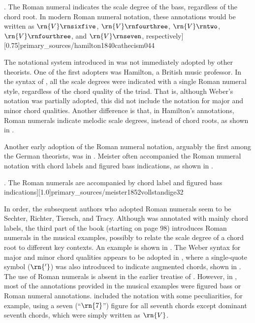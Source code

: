 

\phdfigure[Use of Roman numerals in \textcite[p.
44]{hamilton1840catechism}. The Roman numeral indicates the
scale degree of the bass, regardless of the chord root. In
modern Roman numeral notation, these annotations would be
written as $\rn{V}\rnsixfive$, $\rn{V}\rnfourthree$,
$\rn{V}\rntwo$, $\rn{V}\rnfourthree$, and $\rn{V}\rnseven$,
respectively][0.75]{primary_sources/hamilton1840cathecism044}

The notational system introduced in
\textcite{weber1818versuch} was not immediately adopted by
other theorists. One of the first adopters was Hamilton, a
British music professor. In the syntax of
\textcite{hamilton1840catechism}, all the scale degrees were
indicated with a single Roman numeral style, regardless of
the chord quality of the triad. That is, although Weber's
notation was partially adopted, this did not include the
notation for major and minor chord qualities. Another
difference is that, in Hamilton's annotations, Roman
numerals indicate melodic scale degrees, instead of chord
roots, as shown in
.

Another early adoption of the Roman numeral notation,
arguably the first among the German theorists, was in
\textcite{meister1852vollstandige}. Meister often
accompanied the Roman numeral notation with chord labels and
figured bass indications, as shown in
.

\phdfigure[Use of Roman numerals in \textcite[p.
32]{meister1852vollstandige}. The Roman numerals are
accompanied by chord label and figured bass
indications][1.0]{primary_sources/meister1852vollstandige32}

In order, the subsequent authors who adopted Roman numerals
seem to be Sechter, Richter, Tiersch, and Tracy. Although
\textcite{sechter1853grundsatze} was annotated with mainly
chord labels, the third part of the book (starting on page
98) introduces Roman numerals in the musical examples,
possibly to relate the scale degree of a chord root to
different key contexts. An example is shown in
. The Weber
syntax for major and minor chord qualities appears to be
adopted in \textcite{richter1860lehrbuch}, where a
single-quote symbol ($\rn{'}$) was also introduced to
indicate augmented chords, shown in
. The use of
Roman numerals is absent in the earlier treatise of
\textcite{tiersch1868system}. However,  in
\textcite{tiersch1874elementarbuch}, most of the annotations
provided in the musical examples were figured bass or Roman
numeral annotations. \textcite{tracy1878theory} included the
notation with some peculiarities, for example, using a seven
(``$\rn{7}$'') figure for all seventh chords except dominant
seventh chords, which were simply written as $\rn{V}$.

